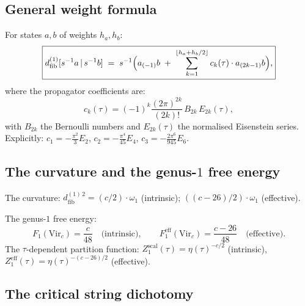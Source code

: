 \documentclass[11pt]{article}
\newcommand{\dfib}{d_{\mathrm{fib}}}
\begin{document}
\subsection{General weight formula}
\label{subsec:wn-general-weight}

For states $a, b$ of weights $h_a, h_b$:
\begin{equation}\label{eq:wn-general-weight}
\boxed{
\dfib^{(1)}[s^{-1}a \,|\, s^{-1}b]
\;=\;
s^{-1}\Bigl(
  a_{(-1)}b
  \;+\;
  \sum_{k=1}^{\lfloor h_a+h_b/2\rfloor}
  c_k(\tau)\cdot a_{(2k-1)}b
\Bigr),
}
\end{equation}
where the propagator coefficients are:
\begin{equation}\label{eq:wn-propagator-coeffs}
c_k(\tau) = (-1)^k\frac{(2\pi)^{2k}}{(2k)!}\,B_{2k}\,E_{2k}(\tau),
\end{equation}
with $B_{2k}$ the Bernoulli numbers and $E_{2k}(\tau)$ the
normalised Eisenstein series.  Explicitly:
$c_1 = -\frac{\pi^2}{3}E_2$,
$c_2 = -\frac{\pi^4}{45}E_4$,
$c_3 = -\frac{2\pi^6}{945}E_6$.

\subsection{The curvature and the genus-$1$ free energy}
\label{subsec:wn-curvature-F1}

The curvature: $\dfib^{(1)\,2} = (c/2)\cdot\omega_1$ (intrinsic);
$((c-26)/2)\cdot\omega_1$ (effective).

The genus-$1$ free energy:
\begin{equation}\label{eq:wn-F1-intrinsic}
F_1(\mathrm{Vir}_c) = \frac{c}{48} \quad\text{(intrinsic)},
\qquad
F_1^{\mathrm{eff}}(\mathrm{Vir}_c) = \frac{c-26}{48}
\quad\text{(effective)}.
\end{equation}
The $\tau$-dependent partition function:
$Z_1^{\mathrm{scal}}(\tau) = \eta(\tau)^{-c/2}$ (intrinsic),
$Z_1^{\mathrm{eff}}(\tau) = \eta(\tau)^{-(c-26)/2}$ (effective).

\subsection{The critical string dichotomy}
\label{subsec:wn-critical}
\end{document}
